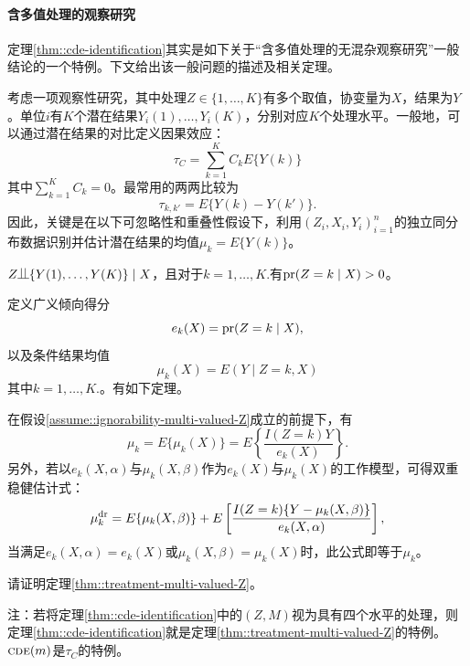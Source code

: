   \paragraph{含多值处理的观察研究}\label{para::obs-multi-valued-Z}
  
定理\ref{thm::cde-identification}其实是如下关于“含多值处理的无混杂观察研究”一般结论的一个特例\citep{imai2004causal, cattaneo2010efficient}。下文给出该一般问题的描述及相关定理。 



考虑一项观察性研究，其中处理$Z \in \{ 1, \ldots, K \}$有多个取值，协变量为$X$，结果为$Y$。单位$i$有$K$个潜在结果$Y_i(1), \ldots, Y_i(K)$，分别对应$K$个处理水平。一般地，可以通过潜在结果的对比定义因果效应：
$$
\tau_C  = \sum_{k=1}^K C_k   E\{  Y(k) \}
$$
其中$  \sum_{k=1}^K C_k  = 0$。最常用的两两比较为
$$
\tau_{k,k'} = E\{   Y(k) - Y(k') \}.
$$
因此，关键是在以下可忽略性和重叠性假设下，利用$(Z_i,  X_i, Y_i)_{i=1}^n$的独立同分布数据识别并估计潜在结果的均值$\mu_k  =  E\{  Y(k) \}$。



\begin{assumption}
\label{assume::ignorability-multi-valued-Z}
$Z\ind \{ Y (1), \ldots, Y (K) \} \mid X$，且对于$k=1,\ldots, K.$有$\textup{pr}(Z = k \mid X) > 0$。
\end{assumption}



定义广义倾向得分
$$
e_k(X) = \textup{pr}(Z = k \mid X), 
$$
以及条件结果均值
$$
\mu_k(X) = E(   Y \mid Z=k,  X )
$$
其中$k=1, \ldots, K.$。有如下定理。

\begin{theorem}
\label{thm::treatment-multi-valued-Z}
在假设\ref{assume::ignorability-multi-valued-Z}成立的前提下，有
$$
\mu_{k} = E\{  \mu_{k}(X) \}
= E \left\{   \frac{I(Z = k) Y}{  e_{k}(X)  }  \right\} .
$$
另外，若以$e_{k}(X, \alpha) $与$\mu_{k}(X, \beta) $作为$e_{k}(X) $与$\mu_{k}(X) $的工作模型，可得双重稳健估计式：
$$
\mu_{k}^{\textup{dr}}  = E\{  \mu_{k}(X, \beta) \} + E \left[   \frac{I(Z=k) \{ Y - \mu_{k}(X, \beta)  \}}{  e_{k}(X, \alpha)  }  \right],
$$
当满足$e_{k}(X, \alpha) = e_{k}(X)$或$\mu_{k}(X, \beta)  = \mu_{k}(X)$时，此公式即等于$\mu_{k} $。
\end{theorem}


请证明定理\ref{thm::treatment-multi-valued-Z}。


注：若将定理\ref{thm::cde-identification}中的$(Z,M)$视为具有四个水平的处理，则定理\ref{thm::cde-identification}就是定理\ref{thm::treatment-multi-valued-Z}的特例。$  \textsc{cde} (m) $是$\tau_C $的特例。 


